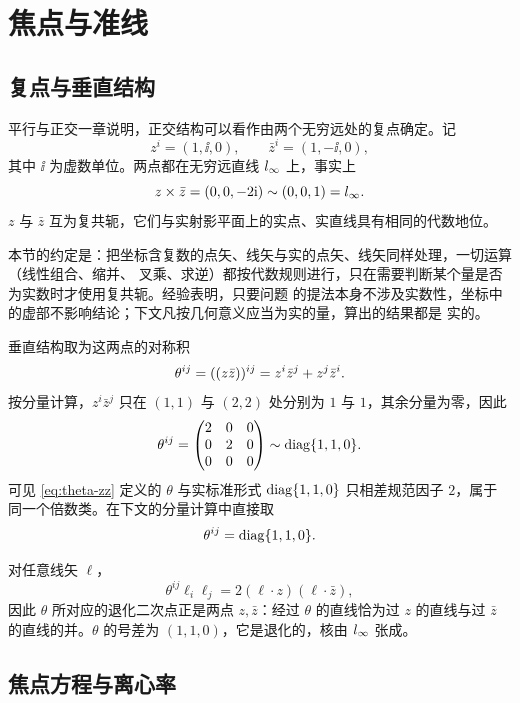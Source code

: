 \chapter{焦点与准线}

\section{复点与垂直结构}

平行与正交一章说明，正交结构可以看作由两个无穷远处的复点确定。记
\begin{equation}
z^i=(1,\ii,0),\qquad \bar z^i=(1,-\ii,0),
\label{eq:zz}
\end{equation}
其中 $\ii$ 为虚数单位。两点都在无穷远直线 $l_{\infty}$ 上，事实上
\[
z\times\bar z=(0,0,-2\mathrm{i})\sim(0,0,1)=l_{\infty} .
\]
$z$ 与 $\bar z$ 互为复共轭，它们与实射影平面上的实点、实直线具有相同的代数地位。

本节的约定是：把坐标含复数的点矢、线矢与实的点矢、线矢同样处理，一切运算（线性组合、缩并、
叉乘、求逆）都按代数规则进行，只在需要判断某个量是否为实数时才使用复共轭。经验表明，只要问题
的提法本身不涉及实数性，坐标中的虚部不影响结论；下文凡按几何意义应当为实的量，算出的结果都是
实的。

垂直结构取为这两点的对称积
\begin{equation}
\theta^{ij}=((z\bar z))^{ij}=z^i\bar z^j+z^j\bar z^i .
\label{eq:theta-zz}
\end{equation}
按分量计算，$z^i\bar z^j$ 只在 $(1,1)$ 与 $(2,2)$ 处分别为 $1$ 与 $1$，其余分量为零，因此
\[
\theta^{ij}=
\begin{pmatrix}
2&0&0\\
0&2&0\\
0&0&0
\end{pmatrix}
\sim\operatorname{diag}\{1,1,0\}.
\]
可见 \eqref{eq:theta-zz} 定义的 $\theta$ 与实标准形式 $\operatorname{diag}\{1,1,0\}$ 只相差规范因子 $2$，属于
同一个倍数类。在下文的分量计算中直接取
\begin{equation}
\theta^{ij}=\operatorname{diag}\{1,1,0\}.
\label{eq:theta-standard}
\end{equation}

对任意线矢 $\ell$，
\begin{equation}
\theta^{ij}\ell_i\ell_j=2(\ell\cdot z)(\ell\cdot\bar z),
\label{eq:theta-line}
\end{equation}
因此 $\theta$ 所对应的退化二次点正是两点 $z,\bar z$：经过 $\theta$ 的直线恰为过 $z$ 的直线与过
$\bar z$ 的直线的并。$\theta$ 的号差为 $(1,1,0)$，它是退化的，核由 $l_{\infty}$ 张成。

\section{焦点方程与离心率}

